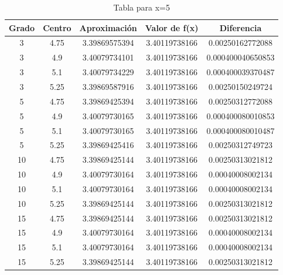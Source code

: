 \documentclass[a4paper,12pt]{report}
\begin{document}
\clearpage

\begin{table}[htb]
\begin{center}
  \caption{Tabla para x=5}
  \begin{tabular}{|c|c|c|c|c|} %
  \hline
         Grado  &  Centro  &  Aproximación    &  Valor de f(x)  &  Diferencia         \\ \hline
            3   &   4.75   &  3.39869575394   &  3.40119738166  &  0.00250162772088   \\ \hline
            3   &   4.9    &  3.40079734101   &  3.40119738166  &  0.000400040650853  \\ \hline
            3   &   5.1    &  3.40079734229   &  3.40119738166  &  0.000400039370487  \\ \hline
            3   &   5.25   &  3.39869587916   &  3.40119738166  &  0.00250150249724   \\ \hline
            5   &   4.75   &  3.39869425394   &  3.40119738166  &  0.00250312772088   \\ \hline
            5   &   4.9    &  3.40079730165   &  3.40119738166  &  0.000400080010853  \\ \hline
            5   &   5.1    &  3.40079730165   &  3.40119738166  &  0.000400080010487  \\ \hline
            5   &   5.25   &  3.39869425416   &  3.40119738166  &  0.00250312749723   \\ \hline
            10  &   4.75   &  3.39869425144   &  3.40119738166  &  0.00250313021812   \\ \hline
            10  &   4.9    &  3.40079730164   &  3.40119738166  &  0.00040008002134   \\ \hline
            10  &   5.1    &  3.40079730164   &  3.40119738166  &  0.00040008002134   \\ \hline
            10  &   5.25   &  3.39869425144   &  3.40119738166  &  0.00250313021812   \\ \hline
            15  &   4.75   &  3.39869425144   &  3.40119738166  &  0.00250313021812   \\ \hline
            15  &   4.9    &  3.40079730164   &  3.40119738166  &  0.00040008002134   \\ \hline
            15  &   5.1    &  3.40079730164   &  3.40119738166  &  0.00040008002134   \\ \hline
            15  &   5.25   &  3.39869425144   &  3.40119738166  &  0.00250313021812   \\ \hline
   \end{tabular}
   \label{Tabla4}
   \end{center}
\end{table}
\end{document}
